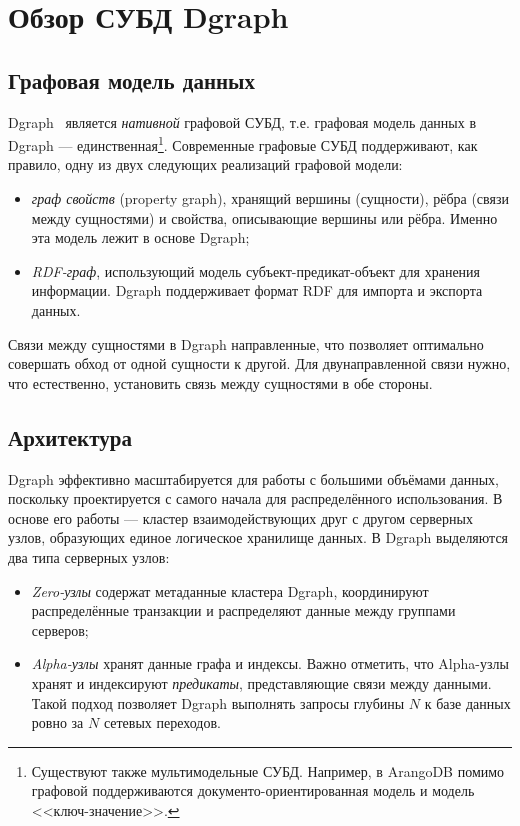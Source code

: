 \section {Обзор СУБД Dgraph}

\subsection{Графовая модель данных}

Dgraph~\cite{dgraph} является \textit{нативной} графовой СУБД, т.е. графовая модель данных в Dgraph
--- единственная\footnote{Существуют также мультимодельные СУБД. Например, в ArangoDB помимо графовой
поддерживаются документо-ориентированная модель и модель <<ключ-значение>>.}. Современные графовые
СУБД поддерживают, как правило, одну из двух следующих реализаций графовой модели:
\begin{itemize}
  \item \textit{граф свойств} (property graph), хранящий вершины (сущности), рёбра (связи между
    сущностями) и свойства, описывающие вершины или рёбра. Именно эта модель лежит в основе Dgraph;
  \item \textit{RDF-граф}, использующий модель субъект-предикат-объект для хранения информации.
    Dgraph поддерживает формат RDF для импорта и экспорта данных.
\end{itemize}

Связи между сущностями в Dgraph направленные, что позволяет оптимально совершать обход от одной
сущности к другой. Для двунаправленной связи нужно, что естественно, установить связь между
сущностями в обе стороны.

\subsection{Архитектура}

Dgraph эффективно масштабируется для работы с большими объёмами данных, поскольку проектируется с
самого начала для распределённого использования. В основе его работы --- кластер взаимодействующих
друг с другом серверных узлов, образующих единое логическое хранилище данных. В Dgraph выделяются
два типа серверных узлов:
\begin{itemize}
  \item \textit{Zero-узлы} содержат метаданные кластера Dgraph, координируют распределённые
    транзакции и распределяют данные между группами серверов;
  \item \textit{Alpha-узлы} хранят данные графа и индексы. Важно отметить, что Alpha-узлы хранят
    и индексируют \textit{предикаты}, представляющие связи между данными. Такой подход позволяет
    Dgraph выполнять запросы глубины $N$ к базе данных ровно за $N$ сетевых переходов.
\end{itemize}

